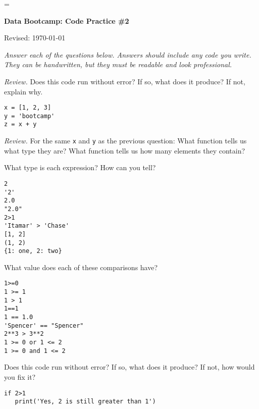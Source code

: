 \documentclass[11pt]{exam}
\begin{document}
\parskip=\bigskipamount
\parindent=0.0in
\thispagestyle{empty}


\bigskip\bigskip
\centerline{\Large \bf Data Bootcamp:  Code Practice \#2}
\centerline{Revised: \today}

\medskip
{\it Answer each of the questions below.
Answers should include any code you write.
They can be handwritten, but they must be readable and look professional.}

\begin{questions}

\item {\it Review.\/} Does this code run without error? If so, what does it produce?  If not, explain why.
\begin{verbatim}
x = [1, 2, 3]
y = 'bootcamp'
z = x + y
\end{verbatim}

\item {\it Review.\/} For the same {\tt x} and {\tt y} as the previous question:
What function tells us what type they are?
What function tells us how many elements they contain? 



\item What type is each expression?  How can you tell?
\begin{verbatim}
2
'2'
2.0
"2.0"
2>1
'Itamar' > 'Chase'
[1, 2]
(1, 2)
{1: one, 2: two}
\end{verbatim}

\item What value does each of these comparisons have?
\begin{verbatim}
1>=0
1 >= 1
1 > 1 
1==1
1 == 1.0
'Spencer' == "Spencer"
2**3 > 3**2
1 >= 0 or 1 <= 2
1 >= 0 and 1 <= 2
\end{verbatim}

\item  Does this code run without error?  If so, what does it produce?  If not, how would you fix it?
\begin{verbatim}
if 2>1
   print('Yes, 2 is still greater than 1')
\end{verbatim}


\end{questions}
\end{document}
